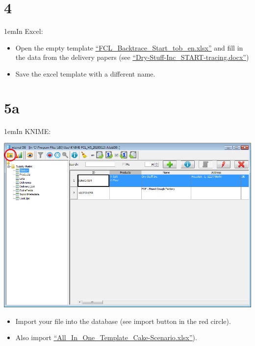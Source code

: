 \documentclass[10pt]{beamer}
\begin{document}
\section{4}
\begin{frame}
\leftskip1em{In Excel:}
	\begin{itemize}
		\item Open the empty template \textcolor{blue}{\underline{\href{https://foodrisklabs.bfr.bund.de/wp-content/uploads/2015/11/FCL\_Backtrace\_Start\_tob\_en.xlsx}{``FCL\_Backtrace\_Start\_tob\_en.xlsx''}}} and fill in the data from the delivery papers (see \textcolor{blue}{\underline{\href{https://github.com/SiLeBAT/BfROpenLabResources/raw/master/GitHubPages/documents/FCL\_Data\_collection\_and\_import/Dry-Stuff-Inc_START-tracing.docx}{``Dry-Stuff-Inc\_START-tracing.docx''}}})
		\item Save the excel template with a different name.
	\end{itemize}
\end{frame}

\section{5a}
\begin{frame}
\leftskip1em{In KNIME:}
	\begin{center}
			\includegraphics[height=0.6\textheight]{5a.png}
	\end{center}
	\begin{itemize}
		\item Import your file into the database (see import button in the red circle).
		\item Also import \textcolor{blue}{\underline{\href{https://github.com/SiLeBAT/BfROpenLabResources/raw/master/GitHubPages/documents/FCL\_Data\_collection\_and\_import/All\_In\_One\_Template\_Cake-Scenario.xlsx}{``All\_In\_One\_Template\_Cake-Scenario.xlsx''}}}).
	\end{itemize}
\end{frame}
\end{document}
